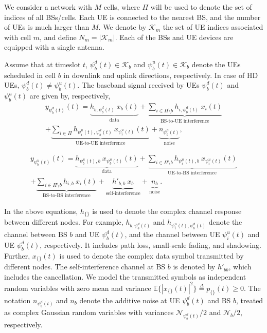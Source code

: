 \documentclass[journal]{IEEEtran}
\begin{document}
We consider a network with $M$ cells, where $\Pi$ will be used to denote the set of indices of all BSs/cells. Each UE is connected to the nearest BS, and the number of UEs is much larger than $M$. We denote by $\mathcal{K}_m$ the set of UE indices associated with cell $m$, and define $N_m = |\mathcal{K}_m|$. Each of the BSs and UE devices are equipped with a single antenna. 

Assume that at timeslot $t$, $\psi_b^d(t) \in \mathcal{K}_b$ and $\psi_b^u(t) \in \mathcal{K}_b$ denote the UEs scheduled in cell $b$ in downlink and uplink directions, respectively. In case of HD UEs, $\psi_b^d(t) \neq \psi_b^u(t)$. The baseband signal received by UEs $\psi_b^d(t)$ and $\psi_b^u(t)$ are given by, respectively, 
\begin{equation}\label{SM1}
\begin{split}
y_{\psi_b^d(t)} (t) = \underbrace{h_{b,\psi_b^d(t)}~x_b(t)}_\text{data} + \underbrace{\sum_{i \in \Pi\setminus b} {h_{i, \psi_b^d(t)}~x_i(t)}}_\text{BS-to-UE interference} \\
+ \underbrace{\sum_{i \in \Pi} {h_{\psi_i^u(t), \psi_b^d(t)}~x_{\psi_i^u(t)}(t)}}_\text{UE-to-UE interference} + \underbrace{n_{\psi_b^d(t)}}_\text{noise},
\end{split}
\end{equation}

\begin{equation}\label{SM2}
\begin{split}
y_{\psi_b^u(t)} (t) = \underbrace{h_{\psi_b^u(t),b}~x_{\psi_b^u(t)}(t)}_\text{data} + \underbrace{\sum_{i \in \Pi\setminus b} {h_{\psi_i^u(t),b}~x_{\psi_i^u(t)}(t)}}_\text{UE-to-BS interference} \\
+ \underbrace{\sum_{i \in \Pi\setminus b} {h_{i,b}~x_i(t)}}_\text{BS-to-BS interference} + \underbrace{h'_{b,b}~x_b}_\text{self-interference} + \underbrace{n_{b}}_\text{noise}.
\end{split}
\end{equation}

In the above equations, $h_{\{\}}$ is used to denote the complex channel response between different nodes. For example, $h_{b,\psi_b^d(t)}$ and $h_{\psi_i^u(t), \psi_b^d(t)}$ denote the channel between BS $b$ and UE $\psi_b^d(t)$, and the channel between UE $\psi_i^u(t)$ and UE $\psi_b^d(t)$, respectively. It includes path loss, small-scale fading, and shadowing. Further, $x_{\{{}\}}(t)$ is used to denote the complex data symbol transmitted by different nodes. The self-interference channel at BS $b$ is denoted by $h'_{bb}$, which includes the cancellation. We model the transmitted symbols as independent random variables with zero mean and variance $\mathbb{E}\{|x_{\{\}}(t)|^2\} \overset{\Delta}{=} p_{\{\}}(t) \geq 0$. The notation $n_{\psi_b^d(t)}$ and $n_{b}$ denote the additive noise at UE ${\psi_b^d(t)}$ and BS $b$, treated as complex Gaussian random variables with variances $\mathcal{N}_{\psi_b^d(t)}/2$ and $\mathcal{N}_{b}/2$, respectively. 
\end{document}
